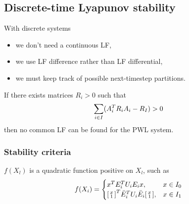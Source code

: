 \subsection{Discrete-time Lyapunov stability}
With discrete systems
%
\begin{itemize}
  \item we don't need a continuous LF,
  \item we use LF difference rather than LF differential,
  \item we must keep track of possible next-timestep partitions.
\end{itemize}

If there exists matrices $R_i > 0$ such that
%
\begin{equation}
  \sum_{i \in I} (A_i^{T} R_i A_i - R_I) > 0
\end{equation}
%
then no common LF can be found for the PWL system.

\subsubsection{Stability criteria}
$f(X_l)$ is a quadratic function positive on $X_l$, such as
%
\begin{equation}
  f(X_i) =
  \begin{cases}
    x^{T} E_i^{T} U_i E_i x, & x \in I_0 \\
    \begin{bsmallmatrix} x \\ 1 \end{bsmallmatrix}^{T} \bar{E}_i^{T} U_i \bar{E}_i \begin{bsmallmatrix} x \\ 1 \end{bsmallmatrix}, & x \in I_1
  \end{cases}
\end{equation}

